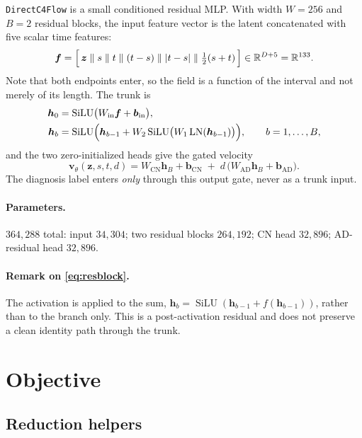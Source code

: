 \documentclass[11pt]{article}
\newcommand{\R}{\mathbb{R}}
\newcommand{\z}{\bm{z}}
\newcommand{\vel}{\bm{v}}
\begin{document}
\texttt{DirectC4Flow} is a small conditioned residual MLP. With width $W = 256$ and
$B = 2$ residual blocks, the input feature vector is the latent concatenated with five
scalar time features:
\begin{equation}
  \bm{f} = \Bigl[\, \z \;\Vert\; s \;\Vert\; t \;\Vert\; (t-s) \;\Vert\; |t-s| \;\Vert\;
  \tfrac{1}{2}(s+t) \,\Bigr] \in \R^{D+5} = \R^{133}.
\end{equation}
Note that both endpoints enter, so the field is a function of the interval and not merely of
its length. The trunk is
\begin{align}
  \bm{h}_0 &= \operatorname{SiLU}\bigl(W_{\mathrm{in}} \bm{f} + \bm{b}_{\mathrm{in}}\bigr), \\
  \bm{h}_b &= \operatorname{SiLU}\Bigl( \bm{h}_{b-1} +
    W_2 \operatorname{SiLU}\bigl(W_1 \operatorname{LN}(\bm{h}_{b-1})\bigr) \Bigr),
    \qquad b = 1, \dots, B,
  \label{eq:resblock}
\end{align}
and the two zero-initialized heads give the gated velocity
\begin{equation}
  \vel_\theta(\z,s,t,d) = W_{\mathrm{CN}} \bm{h}_B + \bm{b}_{\mathrm{CN}}
  \;+\; d\,\bigl( W_{\mathrm{AD}} \bm{h}_B + \bm{b}_{\mathrm{AD}} \bigr).
\end{equation}
The diagnosis label enters \emph{only} through this output gate, never as a trunk input.

\paragraph{Parameters.} $364{,}288$ total: input $34{,}304$; two residual blocks
$264{,}192$; CN head $32{,}896$; AD-residual head $32{,}896$.

\paragraph{Remark on \eqref{eq:resblock}.} The activation is applied to the sum,
$\bm{h}_b = \operatorname{SiLU}(\bm{h}_{b-1} + f(\bm{h}_{b-1}))$, rather than to the branch
only. This is a post-activation residual and does not preserve a clean identity path
through the trunk.

\section{Objective}

\subsection{Reduction helpers}
\end{document}
